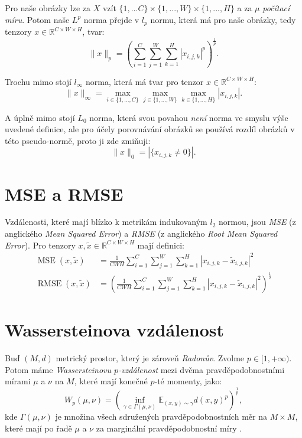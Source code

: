 \documentclass[czech]{article}
\begin{document}
Pro naše obrázky lze za $X$ vzít $\{1, ... C\} \times \{1, ..., W\} \times \{1, ..., H\}$ a za $\mu$ \emph{počítací míru}.
Potom naše $L^p$ norma přejde v $l_p$ normu, která má pro naše obrázky, tedy tenzory $x \in \mathbb{R}^{C \times W \times H}$, tvar:
\begin{equation}
    \|x\|_p = \left( \sum_{i=1}^{C} \sum_{j=1}^{W} \sum_{k=1}^{H} |x_{i, j, k}|^p \right)^{\frac{1}{p}}.
\end{equation}

Trochu mimo stojí $l_{\infty}$ norma, která má tvar pro tenzor $x \in \mathbb{R}^{C \times W \times H}$:
\begin{equation}
    \|x\|_\infty = \max_{i \in \{1, ..., C\}} \max_{j \in \{1, ..., W\}} \max_{k \in \{1, ..., H\}} |x_{i, j, k}|.
\end{equation}

A úplně mimo stojí $L_0$ norma, která svou povahou \emph{není} norma ve smyslu výše uvedené definice,
ale pro účely porovnávání obrázků se používá rozdíl obrázků v této pseudo-normě, proto ji zde zmiňuji:
\begin{equation}
    \|x\|_0 = |\{x_{i, j, k} \neq 0\}|.
\end{equation}

\section{MSE a RMSE}

Vzdálenosti, které mají blízko k metrikám indukovaným $l_2$ normou, jsou \emph{MSE} (z anglického \emph{Mean Squared Error})
a \emph{RMSE} (z anglického \emph{Root Mean Squared Error}).
Pro tenzory $x, \tilde{x} \in \mathbb{R}^{C \times W \times H}$ mají definici:
\begin{align}
    \operatorname{MSE}(x, \tilde{x}) &= \frac{1}{C W H} \sum_{i=1}^C \sum_{j=1}^W \sum_{k=1}^H | x_{i, j, k} - \tilde{x}_{i, j, k} |^2 \\
    \operatorname{RMSE}(x, \tilde{x}) &= \left(\frac{1}{C W H} \sum_{i=1}^C \sum_{j=1}^W \sum_{k=1}^H | x_{i, j, k} - \tilde{x}_{i, j, k} |^2 \right)^{\frac{1}{2}}
\end{align}

\section{Wassersteinova vzdálenost}

Buď $(M, d)$ metrický prostor, který je zároveň \emph{Radonův}. Zvolme $p \in [1, + \infty)$.
Potom máme \emph{Wassersteinovu $p$-vzdálenost} mezi dvěma pravděpodobnostními mírami $\mu$ a $\nu$ na $M$,
které mají konečné $p$-té momenty,
jako:
\begin{equation}
    W_p (\mu, \nu) = \left( \inf_{\gamma \in \Gamma(\mu, \nu)} \mathbb{E}_{(x, y) \sim \gamma} d(x, y)^p \right)^{\frac{1}{p}},
\end{equation}
kde $\Gamma(\mu, \nu)$ je množina všech sdružených pravděpodobnostních měr na $M \times M$,
které mají po řadě $\mu$ a $\nu$ za marginální pravděpodobnostní míry \cite{vaserstejn}.
\end{document}
